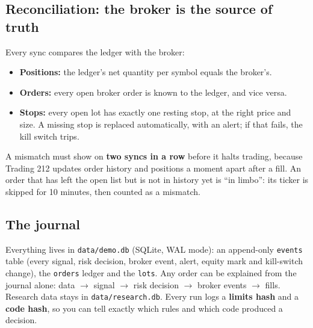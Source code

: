 \documentclass[11pt,a4paper]{article}
\newcommand\code[1]{\texttt{#1}}
\begin{document}
\subsection{Reconciliation: the broker is the source of truth}
Every sync compares the ledger with the broker:
\begin{itemize}
  \item \textbf{Positions:} the ledger's net quantity per symbol equals the broker's.
  \item \textbf{Orders:} every open broker order is known to the ledger, and vice versa.
  \item \textbf{Stops:} every open lot has exactly one resting stop, at the right price and size. A missing stop is
        replaced automatically, with an alert; if that fails, the kill switch trips.
\end{itemize}
A mismatch must show on \textbf{two syncs in a row} before it halts trading, because Trading 212 updates order history and
positions a moment apart after a fill. An order that has left the open list but is not in history yet is ``in limbo'': its
ticker is skipped for 10 minutes, then counted as a mismatch.

\subsection{The journal}
Everything lives in \code{data/demo.db} (SQLite, WAL mode): an append-only \code{events} table (every signal, risk decision,
broker event, alert, equity mark and kill-switch change), the \code{orders} ledger and the \code{lots}. Any order can be
explained from the journal alone: data $\to$ signal $\to$ risk decision $\to$ broker events $\to$ fills. Research data stays in
\code{data/research.db}. Every run logs a \textbf{limits hash} and a \textbf{code hash}, so you can tell exactly which rules
and which code produced a decision.
\end{document}

